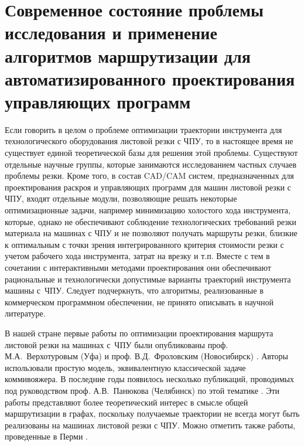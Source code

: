 
\section{Современное состояние проблемы исследования
и применение алгоритмов маршрутизации для автоматизированного
проектирования управляющих программ}
\label{sec:cut.refs}

Если говорить в целом о проблеме оптимизации траектории инструмента для технологического оборудования листовой
резки с ЧПУ,
то в настоящее время не существует единой теоретической базы для решения этой проблемы.
Существуют отдельные научные группы,
которые занимаются исследованием частных случаев проблемы резки.
Кроме того,
в состав CAD/CAM систем,
предназначенных для проектирования раскроя и управляющих программ для машин листовой резки с ЧПУ,
входят отдельные модули,
позволяющие решать некоторые оптимизационные задачи,
например минимизацию холостого хода инструмента,
которые, однако не обеспечивают соблюдение
технологических требований резки материала на машинах с ЧПУ
и не позволяют получать маршруты резки,
близкие к оптимальным с точки зрения интегрированного критерия стоимости резки
с учетом рабочего хода инструмента, затрат на врезку и т.п.
Вместе с тем в сочетании с интерактивными методами проектирования
они обеспечивают рациональные и технологически допустимые варианты траекторий инструмента машины с~ЧПУ.
Следует подчеркнуть, что алгоритмы,
реализованные в коммерческом программном обеспечении,
не принято описывать в научной литературе.

В нашей стране первые работы по оптимизации проектирования маршрута листовой резки на машинах с~ЧПУ
были опубликованы проф. М.А.~Верхотуровым
(Уфа)
\cite{bi:верхотуров2008,bi:верхотуров2008цепь,bi:верхотуров2020}
и проф. В.Д.~Фроловским
(Новосибирск)
\cite{bi:Ganelina,bi:пушкарева,bi:фроловский2005}.
Авторы использовали
простую модель, эквивалентную классической задаче коммивояжера.
В последние годы появилось несколько публикаций,
проводимых под руководством проф. А.В.~Панюкова
(Челябинск) по
этой тематике
\cite{bi:Makarovskikh2019Jan,Makarovskikh20181171,bi:Makarovskikh2019Other}.
Эти работы представляют более теоретический интерес
в смысле общей маршрутизации в графах,
поскольку получаемые траектории не всегда могут быть
реализованы на машинах листовой резки с ЧПУ.
Можно отметить также работы, проведенные в Перми
\cite{bi:мурзакаев2015построение,bi:мурзакаев2015применение,bi:файзрахманов2015,bi:бурылов2016}.

